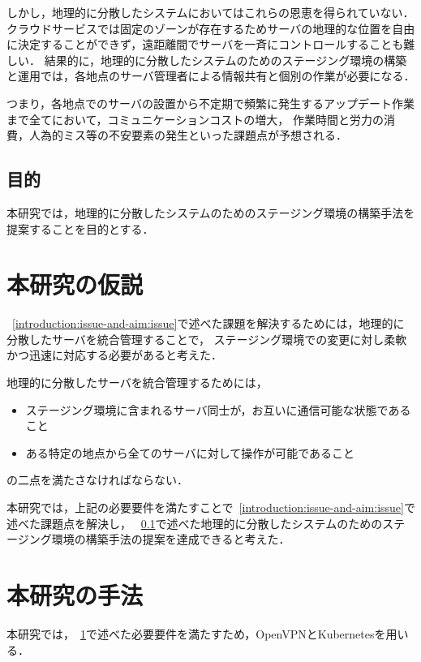 しかし，地理的に分散したシステムにおいてはこれらの恩恵を得られていない．
クラウドサービスでは固定のゾーンが存在するためサーバの地理的な位置を自由に決定することができず，遠距離間でサーバを一斉にコントロールすることも難しい．
結果的に，地理的に分散したシステムのためのステージング環境の構築と運用では，各地点のサーバ管理者による情報共有と個別の作業が必要になる．

つまり，各地点でのサーバの設置から不定期で頻繁に発生するアップデート作業まで全てにおいて，コミュニケーションコストの増大，
作業時間と労力の消費，人為的ミス等の不安要素の発生といった課題点が予想される．

\subsection{目的}
\label{introduction:issue-and-aim:aim}

本研究では，地理的に分散したシステムのためのステージング環境の構築手法を提案することを目的とする．

\section{本研究の仮説}
\label{introduction:hypothesis}

~\ref{introduction:issue-and-aim:issue}で述べた課題を解決するためには，地理的に分散したサーバを統合管理することで，
ステージング環境での変更に対し柔軟かつ迅速に対応する必要があると考えた．

地理的に分散したサーバを統合管理するためには，
\begin{itemize}
  \item ステージング環境に含まれるサーバ同士が，お互いに通信可能な状態であること
  \item ある特定の地点から全てのサーバに対して操作が可能であること
\end{itemize}
の二点を満たさなければならない．

本研究では，上記の必要要件を満たすことで~\ref{introduction:issue-and-aim:issue}で述べた課題点を解決し，
~\ref{introduction:issue-and-aim:aim}で述べた地理的に分散したシステムのためのステージング環境の構築手法の提案を達成できると考えた．

\section{本研究の手法}
\label{introduction:proposal}

本研究では，~\ref{introduction:hypothesis}で述べた必要要件を満たすため，OpenVPNとKubernetesを用いる．


